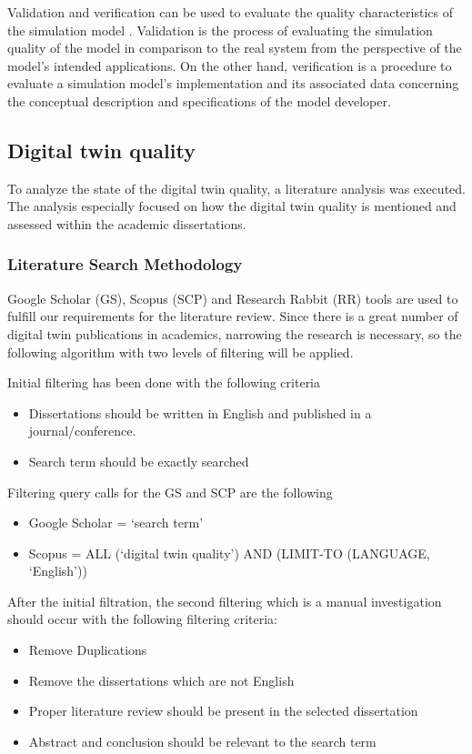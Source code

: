 \documentclass[9pt,conference]{IEEEtran}
\begin{document}
    Validation and verification can be used to evaluate the quality characteristics of the simulation model \cite{StewartSimulation} \cite{VerificationValidationSergent} \cite{OsmanBalci}. 
    Validation is the process of evaluating the simulation quality of the model in comparison to the real system from the perspective of the model's intended applications. 
    On the other hand, verification is a procedure to evaluate a simulation model's implementation and its associated data concerning the conceptual description and specifications of the model developer. 

    \subsection*{Digital twin quality}
    To analyze the state of the digital twin quality, a literature analysis was executed. 
    The analysis especially focused on how the digital twin quality is mentioned and assessed within the academic dissertations.

    \subsubsection*{Literature Search Methodology}
    Google Scholar (GS), Scopus (SCP) and Research Rabbit (RR) tools are used to fulfill our requirements for the literature review. Since there is a great number of digital twin publications in academics,
    narrowing the research is necessary, so the following algorithm with two levels of filtering will be applied.

    Initial filtering has been done with the following criteria
    \begin{itemize}
        \item  Dissertations should be written in English and published in a journal/conference.
        \item  Search term should be exactly searched
    \end{itemize}
    Filtering query calls for the GS and SCP are the following
    \begin{itemize}
        \item Google Scholar = `search term'
        \item Scopus = ALL (`digital twin quality') AND (LIMIT-TO (LANGUAGE, `English'))
    \end{itemize}
    After the initial filtration, the second filtering which is a manual investigation should occur with the following filtering criteria:
    \begin{itemize}
        \item  Remove Duplications
        \item  Remove the dissertations which are not English
        \item  Proper literature review should be present in the selected dissertation
        \item  Abstract and conclusion should be relevant to the search term
    \end{itemize}
\end{document}
